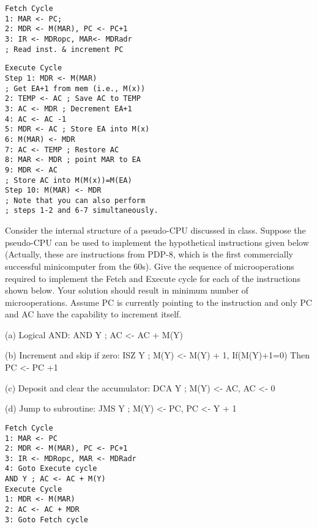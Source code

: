 \documentclass[8pt]{article}
\begin{document}
\begin{multicols}{3}
\begin{verbatim}
Fetch Cycle
1: MAR <- PC;
2: MDR <- M(MAR), PC <- PC+1
3: IR <- MDRopc, MAR<- MDRadr 
; Read inst. & increment PC
\end{verbatim}

\begin{verbatim}
Execute Cycle
Step 1: MDR <- M(MAR) 
; Get EA+1 from mem (i.e., M(x))
2: TEMP <- AC ; Save AC to TEMP
3: AC <- MDR ; Decrement EA+1
4: AC <- AC -1
5: MDR <- AC ; Store EA into M(x)
6: M(MAR) <- MDR
7: AC <- TEMP ; Restore AC
8: MAR <- MDR ; point MAR to EA
9: MDR <- AC 
; Store AC into M(M(x))=M(EA)
Step 10: M(MAR) <- MDR
; Note that you can also perform 
; steps 1-2 and 6-7 simultaneously.
\end{verbatim}


Consider the internal structure of a pseudo-CPU discussed in class. Suppose
the pseudo-CPU can be used to implement the hypothetical instructions given
below (Actually, these are instructions from PDP-8, which is the first
commercially successful minicomputer from the 60s). Give the sequence of
microoperations required to implement the Fetch and Execute cycle for each of
the instructions shown below. Your solution should result in minimum number of
microoperations. Assume PC is currently pointing to the instruction and only
PC and AC have the capability to increment itself.

(a) Logical AND: AND Y ; AC <- AC + M(Y)

(b) Increment and skip if zero: 
ISZ Y ; M(Y) <- M(Y) + 1, If(M(Y)+1=0) Then PC <- PC +1

(c) Deposit and clear the accumulator: DCA
Y ; M(Y) <- AC, AC <- 0

(d) Jump to subroutine: JMS Y ; M(Y) <- PC, PC <- Y + 1

\begin{verbatim}
Fetch Cycle
1: MAR <- PC
2: MDR <- M(MAR), PC <- PC+1
3: IR <- MDRopc, MAR <- MDRadr
4: Goto Execute cycle
AND Y ; AC <- AC + M(Y)
Execute Cycle
1: MDR <- M(MAR)
2: AC <- AC + MDR
3: Goto Fetch cycle
\end{verbatim}



\end{multicols}
\end{document}

